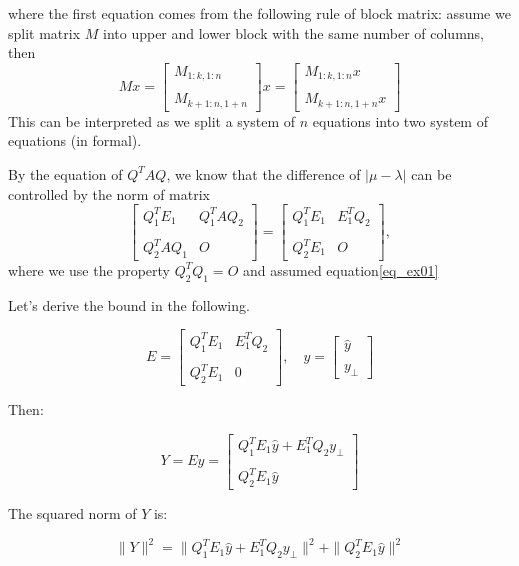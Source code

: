 where the first equation comes from the following rule of block matrix: assume we split matrix $M$ into upper and lower block with the same number of columns, then 
$$
Mx = \begin{bmatrix}
    M_{1:k, 1:n}\\
    \\
    M_{k+1:n, 1+n}
\end{bmatrix}x = \begin{bmatrix}
    M_{1:k, 1:n}x\\
    \\
    M_{k+1:n, 1+n}x
\end{bmatrix}
$$
This can be interpreted as we split a system of $n$ equations into two system of equations (in formal).


By the equation of $Q^{T}AQ$, we know that the difference of $|\mu -\lambda|$ can be controlled by the norm of matrix
$$
\begin{bmatrix}
    Q_{1}^{T} E_{1} & Q_{1}^{T}AQ_{2}\\
    \\
    Q_{2}^{T} A Q_{1} & O
\end{bmatrix} =\begin{bmatrix}
    Q_{1}^{T} E_{1} & E_{1}^{T} Q_{2}\\
    \\
    Q_{2}^{T} E_{1} & O
\end{bmatrix},
$$
where we use the property $Q_{2}^{T} Q_{1} = O$ and assumed equation\eqref{eq_ex01}

Let's derive the bound in the following.

$$
E = \begin{bmatrix} 
Q_1^T E_1 & E_1^T Q_2 \\
\\ 
Q_2^T E_1 & 0 \end{bmatrix}, \quad y = 
\begin{bmatrix} \hat{y} \\
\\ 
y_\perp \end{bmatrix}
$$

Then:

$$
Y = Ey = \begin{bmatrix} 
Q_1^T E_1 \hat{y} + E_1^T Q_2 y_\perp \\
\\
Q_2^T E_1 \hat{y} \end{bmatrix}
$$

The squared norm of $Y$ is:

$$
\|Y\|^2 = \|Q_1^T E_1 \hat{y} + E_1^T Q_2 y_\perp\|^2 + \|Q_2^T E_1 \hat{y}\|^2
$$

